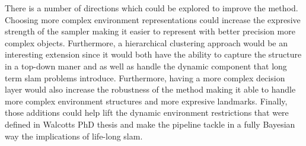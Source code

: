 \documentclass[]{article}
\begin{document}
    There is a number of directions which could be explored to improve the method. Choosing more complex environment representations could increase the expresive strength of the sampler making it easier to represent with better precision more complex objects. Furthermore, a hierarchical clustering approach would be an interesting extension since it would both have the ability to capture the structure in a top-down maner and as well as handle the dynamic component that long term slam problems introduce. Furthermore, having a more complex decision layer would also increase the robustness of the method making it able to handle more complex environment structures and more expresive landmarks. Finally, those additions could help lift the dynamic environment restrictions that were defined in Walcotts PhD thesis and make the pipeline tackle in a fully Bayesian way the implications of life-long slam.

\end{document}

